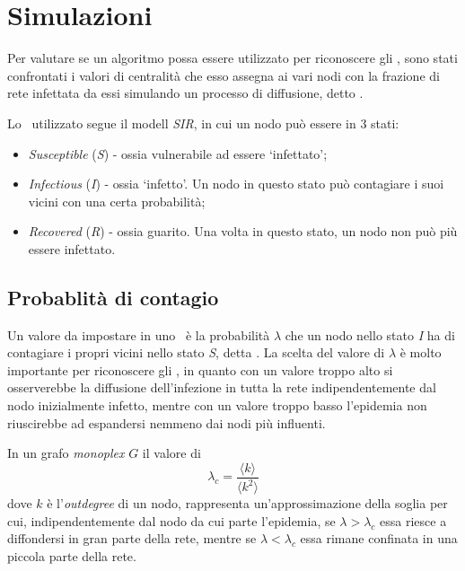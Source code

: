 \chapter{Simulazioni}

Per valutare se un algoritmo possa essere utilizzato per riconoscere gli \infsp, 
sono stati confrontati i valori di centralità che esso assegna ai vari nodi con la frazione di 
rete infettata da essi simulando un processo di diffusione, detto \spproc.

Lo \spproc\ utilizzato segue il modell \textit{SIR}, in cui un nodo può essere in 3 stati:
\begin{itemize}
    \item \textit{Susceptible} (\textit{S}) - ossia vulnerabile ad essere `infettato';
    \item \textit{Infectious} (\textit{I}) - ossia `infetto'. Un nodo in questo stato può contagiare
        i suoi vicini con una certa probabilità;
    \item \textit{Recovered} (\textit{R}) - ossia guarito. Una volta in questo stato, un nodo non può più essere
        infettato.
\end{itemize}

\section{Probablità di contagio}
Un valore da impostare in uno \spproc\ è la probabilità $\lambda$ che un nodo nello stato \textit{I}
ha di contagiare i propri vicini nello stato \textit{S}, detta \epprob.
La scelta del valore di $\lambda$ è molto importante per riconoscere gli \infsp, 
in quanto con un valore troppo alto si osserverebbe la diffusione dell'infezione in tutta la 
rete indipendentemente dal nodo inizialmente infetto, mentre con un valore troppo basso l'epidemia 
non riuscirebbe ad espandersi nemmeno dai nodi più influenti. 

In un grafo \textit{monoplex} $G$ il valore di \crepp\
\begin{equation}
    \lambda_c = \frac{\langle k  \rangle}{\langle k^2 \rangle}
\end{equation}
dove $k$ è l'\textit{outdegree} di un nodo, rappresenta un'approssimazione della soglia per 
cui, indipendentemente dal nodo da cui parte l'epidemia, se $\lambda > \lambda_c$ essa riesce 
a diffondersi in gran parte della rete, mentre se $\lambda < \lambda_c$ essa rimane confinata 
in una piccola parte della rete\cite{saumell:epidemicsp}.

